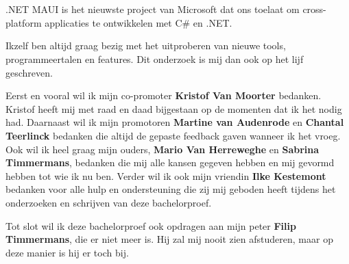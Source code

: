 
\chapter*{}%
\label{ch:voorwoord}


.NET MAUI is het nieuwste project van Microsoft dat ons toelaat om cross-platform applicaties te ontwikkelen met C\# en .NET. 

Ikzelf ben altijd graag bezig met het uitproberen van nieuwe tools, programmeertalen en features. Dit onderzoek is mij dan ook op het lijf geschreven.

Eerst en vooral wil ik mijn co-promoter \textbf{Kristof Van Moorter} bedanken. Kristof heeft mij met raad en daad bijgestaan op de momenten dat ik het nodig had. Daarnaast wil ik mijn promotoren \textbf{Martine van Audenrode} en \textbf{Chantal Teerlinck} bedanken die altijd de gepaste feedback gaven wanneer ik het vroeg. Ook wil ik heel graag mijn ouders, \textbf{Mario Van Herreweghe} en \textbf{Sabrina Timmermans}, bedanken die mij alle kansen gegeven hebben en mij gevormd hebben tot wie ik nu ben. Verder wil ik ook mijn vriendin \textbf{Ilke Kestemont} bedanken voor alle hulp en ondersteuning die zij mij geboden heeft tijdens het onderzoeken en schrijven van deze bachelorproef.

Tot slot wil ik deze bachelorproef ook opdragen aan mijn peter \textbf{Filip Timmermans}, die er niet meer is. Hij zal mij nooit zien afstuderen, maar op deze manier is hij er toch bij.